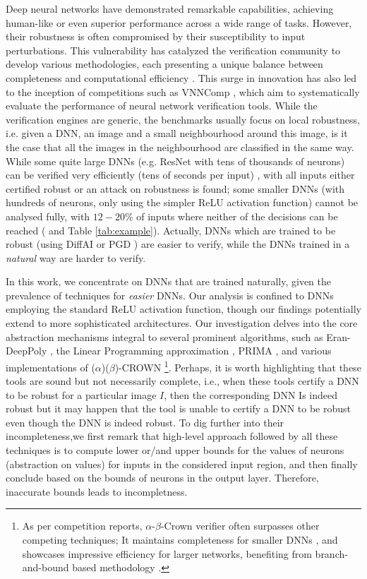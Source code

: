 Deep neural networks have demonstrated remarkable capabilities, achieving human-like or even superior performance across a wide range of tasks. However, their robustness is often compromised by their susceptibility to input perturbations. This vulnerability has catalyzed the verification community to develop various methodologies, each presenting a unique balance between completeness and computational efficiency \cite{katz2019marabou,Reluplex,deeppoly}. This surge in innovation has also led to the inception of competitions such as VNNComp \cite{VNNcomp}, which aim to systematically evaluate the performance of neural network verification tools.
While the verification engines are generic, the benchmarks usually focus on local robustness, i.e. given a DNN, an image and a small neighbourhood around this image, 
is it the case that all the images in the neighbourhood are classified in the same way.
While some quite large DNNs (e.g. ResNet with tens of thousands of neurons) can be verified very efficiently (tens of seconds per input) \cite{crown}, with all inputs either certified robust or an attack on robustness is found; some smaller DNNs (with hundreds of neurons, only using the simpler ReLU activation function) cannot be analysed fully, with $12-20\%$ of inputs where neither of the decisions can be reached (\cite{crown} and Table \ref{tab:example}). Actually, DNNs which are trained to be robust (using DiffAI \cite{DiffAI} or PGD \cite{PGD}) are easier to verify, while the DNNs trained in a {\em natural} way are harder to verify.

In this work, we concentrate on DNNs that are trained naturally, given the prevalence of techniques for {\em easier} DNNs. Our analysis is confined to DNNs employing the standard ReLU activation function, though our findings potentially extend to more sophisticated architectures. Our investigation delves into the core abstraction mechanisms integral to several prominent algorithms, such as Eran-DeepPoly \cite{deeppoly}, the Linear Programming approximation \cite{MILP}, PRIMA \cite{prima}, and various implementations of ($\alpha$)($\beta$)-CROWN \cite{crown}\footnote{
 As per competition reports, $\alpha$-$\beta$-Crown verifier often surpasses other competing techniques\cite{crown};  It maintains completeness for smaller DNNs \cite{xu2020fast}, and showcases impressive efficiency for larger networks, benefiting from branch-and-bound based methodology \cite{cutting,BaB}.
}. Perhaps, it is worth highlighting that these tools are  sound but not necessarily complete, i.e., when these tools certify a DNN to be robust for a particular image $I$, then the corresponding DNN Is indeed robust but it may happen that the tool is unable to certify a DNN to be robust even though the DNN is indeed robust. To dig further into their incompleteness,we first remark that high-level approach followed by all these techniques is to compute lower or/and upper bounds for the values of neurons (abstraction on values) for inputs in the considered input region, and then finally conclude based on the bounds of neurons in the output layer.  Therefore, inaccurate bounds leads to incompletness. 


